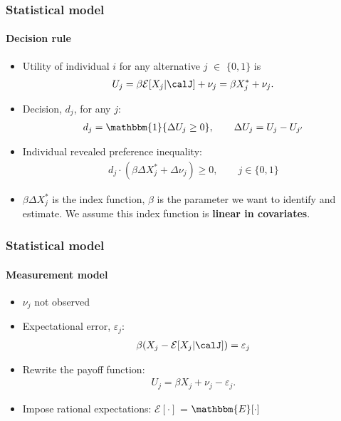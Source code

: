 \begin{frame}
\frametitle{Statistical model} \framesubtitle{Decision rule}

\begin{itemize}
\item Utility of individual $i$ for any alternative $j$ $\in$ $\{0,1\}$ is  
\begin{align*}
U_{j}=\beta\mathcal{E}[X_{j}|\calJ]+\nu_{j}=\beta X^{*}_{j} + \nu_{j}.
\end{align*}

\item Decision, $d_{j}$, for any $j$:  
\begin{align*}
d_{j} = \mathbbm{1}\{\Delta U_{j}\geq 0\},\qquad\Delta U_{j} =
U_{j}-U_{j^{\prime }}
\end{align*}

\item Individual revealed preference inequality:  
\begin{align*}
d_{j} \cdot (\beta\Delta X^{*}_{j}+\Delta\nu_{j})\geq 0, \qquad j \in \{0,1\}
\end{align*}

\item $\beta\Delta X^{*}_{j}$ is the index function, $\beta$ is the
parameter we want to identify and estimate. We assume this index function is 
\textbf{linear in covariates}.
\end{itemize}
\end{frame}


\begin{frame}
\frametitle{Statistical model} \framesubtitle{Measurement model}

\begin{itemize}
\item $\nu_{j}$ not observed 

\item Expectational error, $\varepsilon_{j}$:  
\begin{align*}
\beta(X_{j} - \mathcal{E}[X_{j}|\calJ] )= \varepsilon_{j}
\end{align*}

\item Rewrite the payoff function:  
\begin{align*}
U_{j} = \beta X_{j}+\nu_{j}-\varepsilon_{j}.
\end{align*}

\item Impose rational expectations: $\mathcal{E}[\cdot]$ = $%
\mathbbm{E}[\cdot]$
\end{itemize}
\end{frame}


